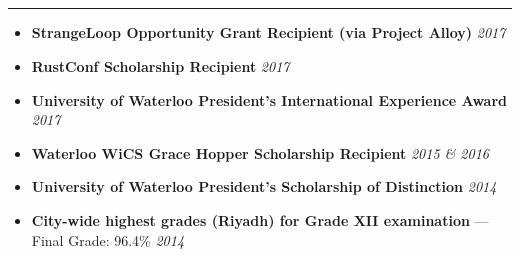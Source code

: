 \documentclass[5pt,letterpaper]{article}
\begin{document}
\subsection*{}
\hrule
\vspace{1.0em}
\begin{itemize}[leftmargin=1em, noitemsep]
  \item[] \textbf{StrangeLoop Opportunity Grant Recipient (via Project Alloy)} \hfill \emph{2017}
  \item[] \textbf{RustConf Scholarship Recipient} \hfill \emph{2017}
  \item[] \textbf{University of Waterloo President's International Experience Award} \hfill \emph{2017}
  \item[] \textbf{Waterloo WiCS Grace Hopper Scholarship Recipient} \hfill \emph{2015 \& 2016}
  \item[] \textbf{University of Waterloo President's Scholarship of Distinction} \hfill \emph{2014}
  \item[] \textbf{City-wide highest grades (Riyadh) for Grade XII examination} --- Final Grade: 96.4\% \hfill \emph{2014}
\end{itemize}
\end{document}
